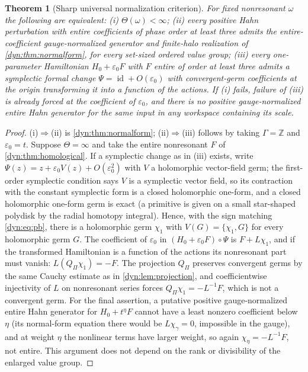 \documentclass[11pt,letterpaper]{article}
\newtheorem{theorem}{Theorem}[section]
\theoremstyle{definition}
\theoremstyle{remark}
\newcommand{\Z}{\mathbb Z}
\newcommand{\id}{\operatorname{id}}
\newcommand{\eps}{\varepsilon}
\numberwithin{equation}{section}
\begin{document}
\begin{theorem}[Sharp universal normalization criterion]\label{dyn:thm:universal}
For fixed nonresonant $\omega$ the following are equivalent:
(i) $\Theta(\omega)<\infty$; (ii) \emph{every} positive Hahn perturbation
with entire coefficients of phase order at least three admits the
entire-coefficient gauge-normalized generator and finite-halo realization
of \cref{dyn:thm:normalform}, for \emph{every} set-sized ordered value
group; (iii) every one-parameter Hamiltonian $H_0+\eps_0F$ with $F$ entire
of order at least three admits a symplectic formal change
$\Psi=\id+O(\eps_0)$ with \emph{convergent-germ} coefficients at the origin
transforming it into a function of the actions. If (i) fails, failure of
(iii) is already forced at the coefficient of $\eps_0$, and there is no
positive gauge-normalized entire Hahn generator for the same input in any
workspace containing its scale.
\end{theorem}
\begin{proof}
(i)$\Rightarrow$(ii) is \cref{dyn:thm:normalform}; (ii)$\Rightarrow$(iii)
follows by taking $\Gamma=\Z$ and $\eps_0=t$. Suppose $\Theta=\infty$ and
take the entire nonresonant $F$ of \cref{dyn:thm:homological}. If a
symplectic change as in (iii) exists, write
$\Psi(z)=z+\eps_0V(z)+O(\eps_0^{2})$ with $V$ a holomorphic vector-field
germ; the first-order symplectic condition says $V$ is a symplectic vector
field, so its contraction with the constant symplectic form is a closed
holomorphic one-form, and a closed holomorphic one-form germ is exact (a
primitive is given on a small star-shaped polydisk by the radial homotopy
integral). Hence, with the sign matching \eqref{dyn:eq:pb}, there is a
holomorphic germ $\chi_1$ with $V(G)=\{\chi_1,G\}$ for every holomorphic
germ $G$. The coefficient of $\eps_0$ in
$(H_0+\eps_0F)\circ\Psi$ is $F+L\chi_1$, and if the transformed Hamiltonian
is a function of the actions its nonresonant part must vanish:
$L(Q_\Pi\chi_1)=-F$. The projection $Q_\Pi$ preserves convergent germs by
the same Cauchy estimate as in \cref{dyn:lem:projection}, and
coefficientwise injectivity of $L$ on nonresonant series forces
$Q_\Pi\chi_1=-L^{-1}F$, which is not a convergent germ. For the final
assertion, a putative positive gauge-normalized entire Hahn generator for
$H_0+t^{\eta}F$ cannot have a least nonzero coefficient below $\eta$ (its
normal-form equation there would be $L\chi_\gamma=0$, impossible in the
gauge), and at weight $\eta$ the nonlinear terms have larger weight, so
again $\chi_\eta=-L^{-1}F$, not entire. This argument does not depend on
the rank or divisibility of the enlarged value group.
\end{proof}
\end{document}
